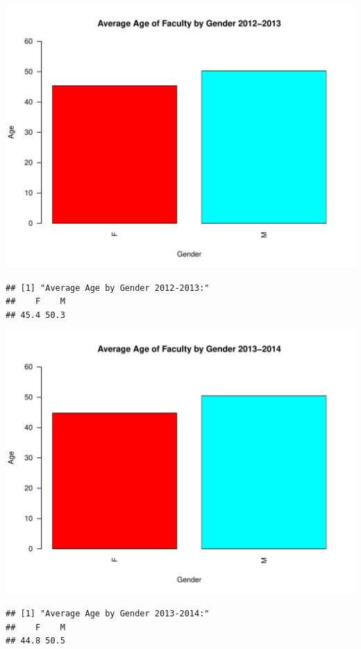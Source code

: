 \documentclass[12pt,a4paper]{article}\usepackage[]{graphicx}\usepackage[]{color}
\makeatletter
\def\maxwidth{ %
  \ifdim\Gin@nat@width>\linewidth
    \linewidth
  \else
    \Gin@nat@width
  \fi
}
\newenvironment{kframe}{%
 \def\at@end@of@kframe{}%
 \ifinner\ifhmode%
  \def\at@end@of@kframe{\end{minipage}}%
  \begin{minipage}{\columnwidth}%
 \fi\fi%
 \def\FrameCommand##1{\hskip\@totalleftmargin \hskip-\fboxsep
 \colorbox{shadecolor}{##1}\hskip-\fboxsep
     \hskip-\linewidth \hskip-\@totalleftmargin \hskip\columnwidth}%
 \MakeFramed {\advance\hsize-\width
   \@totalleftmargin\z@ \linewidth\hsize
   \@setminipage}}%
 {\par\unskip\endMakeFramed%
 \at@end@of@kframe}
\newenvironment{knitrout}{}{} %
\theoremstyle{definition}
\makeatother
\begin{document}
\begin{knitrout}
\includegraphics[width=\maxwidth]{figure/unnamed-chunk-10-9} 
\begin{kframe}\begin{verbatim}
## [1] "Average Age by Gender 2012-2013:"
##    F    M 
## 45.4 50.3
\end{verbatim}
\end{kframe}
\includegraphics[width=\maxwidth]{figure/unnamed-chunk-10-10} 
\begin{kframe}\begin{verbatim}
## [1] "Average Age by Gender 2013-2014:"
##    F    M 
## 44.8 50.5
\end{verbatim}
\end{kframe}
\end{knitrout}
\end{document}
